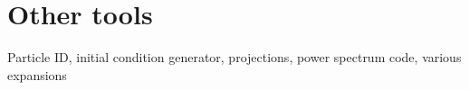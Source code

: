 \section{Other tools}

Particle ID, initial condition generator, projections, power spectrum code,  various expansions
